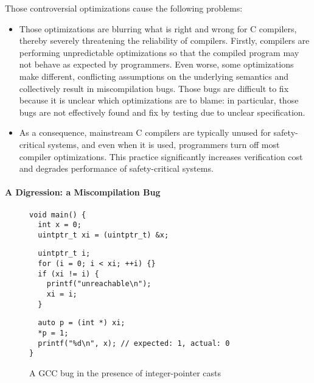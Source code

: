 
Those controversial optimizations cause the following problems:
%
\begin{itemize}
\item Those optimizations are blurring what is right and wrong for C compilers, thereby severely
  threatening the reliability of compilers.  Firstly, compilers are performing unpredictable
  optimizations so that the compiled program may not behave as expected by programmers.  Even worse,
  some optimizations make different, conflicting assumptions on the underlying semantics and
  collectively result in miscompilation bugs.  Those bugs are difficult to fix because it is unclear
  which optimizations are to blame: in particular, those bugs are not effectively found and fix by
  testing due to unclear specification.

\item As a consequence, mainstream C compilers are typically unused for safety-critical systems, and
  even when it is used, programmers turn off most compiler optimizations.  This practice
  significantly increases verification cost and degrades performance of safety-critical systems.
\end{itemize}




\paragraph{A Digression: a Miscompilation Bug}

\begin{figure}[t]
\begin{center}
\small
\begin{minipage}{0.5\textwidth}
\begin{verbatim}
void main() { 
  int x = 0;
  uintptr_t xi = (uintptr_t) &x;
\end{verbatim}
\vskip -0.7cm
\begin{verbatim}
  uintptr_t i;
  for (i = 0; i < xi; ++i) {}
  if (xi != i) {
    printf("unreachable\n");
    xi = i;
  }
\end{verbatim}
\vskip -0.7cm
\begin{verbatim}
  auto p = (int *) xi;
  *p = 1;
  printf("%d\n", x); // expected: 1, actual: 0
}
\end{verbatim}
\end{minipage}
\end{center}
\caption{A GCC bug in the presence of integer-pointer casts}
\label{fig:introduction:bug}
\end{figure}

